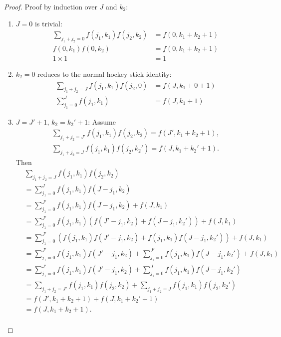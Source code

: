 \documentclass{article}
\begin{document}
\begin{proof}
  Proof by induction over $J$ and $k_2$:
  \begin{enumerate}
  \item $J=0$ is trivial:
    \begin{align*}
      \sum_{j_1+j_2=0}f(j_1, k_1)f(j_2, k_2) &= f(0, k_1+k_2+1) \\
      f(0, k_1)f(0, k_2) &= f(0, k_1+k_2+1) \\
      1\times1 &= 1
    \end{align*}
  \item $k_2=0$ reduces to the normal hockey stick identity:
    \begin{align*}
      \sum_{j_1+j_2=J}f(j_1, k_1)f(j_2, 0) &= f(J, k_1+0+1) \\
      \sum_{j_1=0}^{J}f(j_1, k_1) &= f(J, k_1+1)
    \end{align*}
  \item $J=J'+1$, $k_2=k_2'+1$: Assume
    \begin{align*}
      \sum_{j_1+j_2=J'}f(j_1, k_1)f(j_2, k_2) = f(J', k_1+k_2+1), \\
      \sum_{j_1+j_2=J}f(j_1, k_1)f(j_2, k_2') = f(J, k_1+k_2'+1).
    \end{align*}
    Then
    \begin{align*}
      & \sum_{j_1+j_2=J}f(j_1, k_1)f(j_2, k_2) \\
      &= \sum_{j_1=0}^{J}f(j_1, k_1)f(J-j_1, k_2) \\
      &= \sum_{j_1=0}^{J'}f(j_1, k_1)f(J-j_1, k_2)+f(J, k_1) \\
      &= \sum_{j_1=0}^{J'}f(j_1, k_1)(f(J'-j_1, k_2)+f(J-j_1, k_2'))+f(J, k_1) \\
      &= \sum_{j_1=0}^{J'}(f(j_1, k_1)f(J'-j_1, k_2)+f(j_1, k_1)f(J-j_1, k_2'))+f(J, k_1) \\
      &= \sum_{j_1=0}^{J'}f(j_1, k_1)f(J'-j_1, k_2)+\sum_{j_1=0}^{J'}f(j_1, k_1)f(J-j_1, k_2')+f(J, k_1) \\
      &= \sum_{j_1=0}^{J'}f(j_1, k_1)f(J'-j_1, k_2)+\sum_{j_1=0}^{J}f(j_1, k_1)f(J-j_1, k_2') \\
      &= \sum_{j_1+j_2=J'}f(j_1, k_1)f(j_2, k_2)+\sum_{j_1+j_2=J}f(j_1, k_1)f(j_2, k_2') \\
      &= f(J', k_1+k_2+1)+f(J, k_1+k_2'+1) \\
      &= f(J, k_1+k_2+1). \\
    \end{align*}
  \end{enumerate}
\end{proof}
\end{document}
